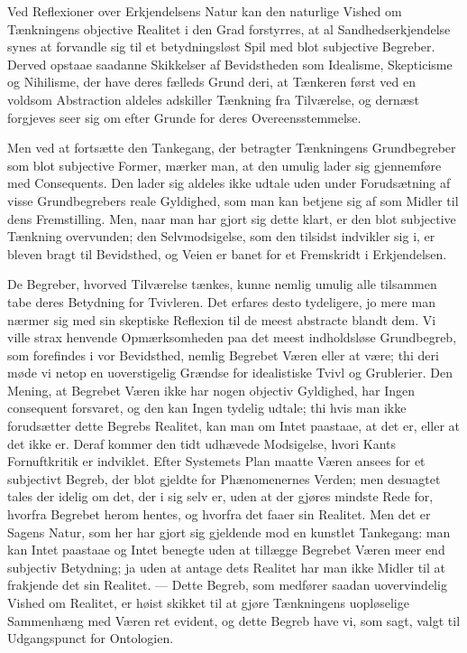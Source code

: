 \documentclass[12pt]{article}
\newcommand{\opage}[1]{\marginnote{\footnotesize\textit{[#1]}}}
\begin{document}
Ved Reflexioner over Erkjendelsens Natur kan den naturlige Vished om Tænkningens
objective Realitet i den Grad forstyrres, at al Sandhedserkjendelse synes at
forvandle sig til et betydningsløst Spil med blot subjective Begreber. Derved
opstaae saadanne Skikkelser af Bevidstheden som Idealisme, Skepticisme og
Nihilisme, der have deres fælleds Grund deri, at Tænkeren først ved en voldsom
Abstraction aldeles adskiller Tænkning fra Tilværelse, og dernæst forgjeves seer
sig om efter Grunde for deres Overeensstemmelse.

Men ved at fortsætte den Tankegang, der betragter Tænkningens Grundbegreber som
blot subjective Former, mærker man, at den umulig lader sig gjennemføre med
Consequents. Den lader sig aldeles ikke udtale uden under Forudsætning af visse
Grundbegrebers reale Gyldighed, som man kan betjene sig af som Midler til dens
Fremstilling. Men, naar man har gjort sig dette klart, er den blot subjective
Tænkning overvunden; den Selvmodsigelse, som den tilsidst indvikler sig i, er
bleven bragt til Bevidsthed, og Veien er banet for et Fremskridt i Erkjendelsen.

De Begreber, hvorved Tilværelse tænkes, kunne nemlig \opage{207}umulig alle
tilsammen tabe deres Betydning for Tvivleren. Det erfares desto tydeligere, jo
mere man nærmer sig med sin skeptiske Reflexion til de meest abstracte blandt
dem. Vi ville strax henvende Opmærksomheden paa det meest indholdsløse
Grundbegreb, som forefindes i vor Bevidsthed, nemlig Begrebet Væren eller at
være; thi deri møde vi netop en uoverstigelig Grændse for idealistiske Tvivl og
Grublerier. Den Mening, at Begrebet Væren ikke har nogen objectiv Gyldighed, har
Ingen consequent forsvaret, og den kan Ingen tydelig udtale; thi hvis man ikke
forudsætter dette Begrebs Realitet, kan man om Intet paastaae, at det er, eller
at det ikke er. Deraf kommer den tidt udhævede Modsigelse, hvori Kants
Fornuftkritik er indviklet. Efter Systemets Plan maatte Væren ansees for et
subjectivt Begreb, der blot gjeldte for Phænomenernes Verden; men desuagtet
tales der idelig om det, der i sig selv er, uden at der gjøres mindste Rede for,
hvorfra Begrebet herom hentes, og hvorfra det faaer sin Realitet. Men det er
Sagens Natur, som her har gjort sig gjeldende mod en kunstlet Tankegang: man kan
Intet paastaae og Intet benegte uden at tillægge Begrebet Væren meer end
subjectiv Betydning; ja uden at antage dets Realitet har man ikke Midler til at
frakjende det sin Realitet. --- Dette Begreb, som medfører saadan uovervindelig
Vished om Realitet, er høist skikket til at gjøre Tænkningens uopløselige
Sammenhæng med Væren ret evident, og dette Begreb have vi, som sagt, valgt til
Udgangspunct for Ontologien.
\end{document}
